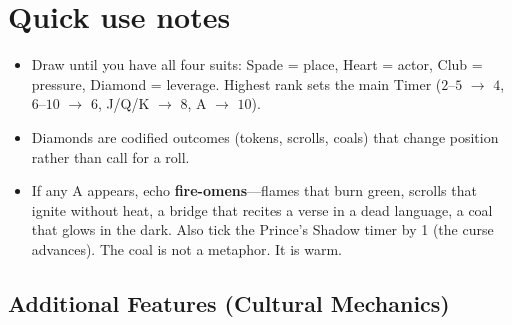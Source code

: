 \section*{Quick use notes}
\label{sec:pereshi-quick-use}
\begin{itemize}
\item Draw until you have all four suits: Spade = place, Heart = actor, Club = pressure, Diamond = leverage. Highest rank sets the main Timer ($2$--$5$ $\rightarrow$ $4$, $6$--$10$ $\rightarrow$ $6$, J/Q/K $\rightarrow$ $8$, A $\rightarrow$ $10$).
\item Diamonds are codified outcomes (tokens, scrolls, coals) that change position rather than call for a roll.
\item If any A appears, echo \textbf{fire-omens}---flames that burn green, scrolls that ignite without heat, a bridge that recites a verse in a dead language, a coal that glows in the dark. Also tick the Prince's Shadow timer by 1 (the curse advances). The coal is not a metaphor. It is warm.
\end{itemize}

\subsection*{Additional Features (Cultural Mechanics)}
\label{sec:pereshi-mechanics}

